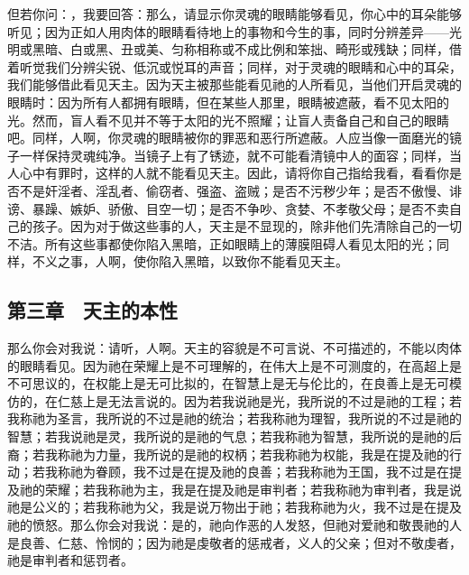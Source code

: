 但若你问：，我要回答：那么，请显示你灵魂的眼睛能够看见，你心中的耳朵能够听见；因为正如人用肉体的眼睛看待地上的事物和今生的事，同时分辨差异——光明或黑暗、白或黑、丑或美、匀称相称或不成比例和笨拙、畸形或残缺；同样，借着听觉我们分辨尖锐、低沉或悦耳的声音；同样，对于灵魂的眼睛和心中的耳朵，我们能够借此看见天主。因为天主被那些能看见祂的人所看见，当他们开启灵魂的眼睛时：因为所有人都拥有眼睛，但在某些人那里，眼睛被遮蔽，看不见太阳的光。然而，盲人看不见并不等于太阳的光不照耀；让盲人责备自己和自己的眼睛吧。同样，人啊，你灵魂的眼睛被你的罪恶和恶行所遮蔽。人应当像一面磨光的镜子一样保持灵魂纯净。当镜子上有了锈迹，就不可能看清镜中人的面容；同样，当人心中有罪时，这样的人就不能看见天主。因此，请将你自己指给我看，看看你是否不是奸淫者、淫乱者、偷窃者、强盗、盗贼；是否不污秽少年；是否不傲慢、诽谤、暴躁、嫉妒、骄傲、目空一切；是否不争吵、贪婪、不孝敬父母；是否不卖自己的孩子。因为对于做这些事的人，天主是不显现的，除非他们先清除自己的一切不洁。所有这些事都使你陷入黑暗，正如眼睛上的薄膜阻碍人看见太阳的光；同样，不义之事，人啊，使你陷入黑暗，以致你不能看见天主。\par


\subsection{第三章　天主的本性}

那么你会对我说：请听，人啊。天主的容貌是不可言说、不可描述的，不能以肉体的眼睛看见。因为祂在荣耀上是不可理解的，在伟大上是不可测度的，在高超上是不可思议的，在权能上是无可比拟的，在智慧上是无与伦比的，在良善上是无可模仿的，在仁慈上是无法言说的。因为若我说祂是光，我所说的不过是祂的工程；若我称祂为圣言，我所说的不过是祂的统治；若我称祂为理智，我所说的不过是祂的智慧；若我说祂是灵，我所说的是祂的气息；若我称祂为智慧，我所说的是祂的后裔；若我称祂为力量，我所说的是祂的权柄；若我称祂为权能，我是在提及祂的行动；若我称祂为眷顾，我不过是在提及祂的良善；若我称祂为王国，我不过是在提及祂的荣耀；若我称祂为主，我是在提及祂是审判者；若我称祂为审判者，我是说祂是公义的；若我称祂为父，我是说万物出于祂；若我称祂为火，我不过是在提及祂的愤怒。那么你会对我说：是的，祂向作恶的人发怒，但祂对爱祂和敬畏祂的人是良善、仁慈、怜悯的；因为祂是虔敬者的惩戒者，义人的父亲；但对不敬虔者，祂是审判者和惩罚者。\par

